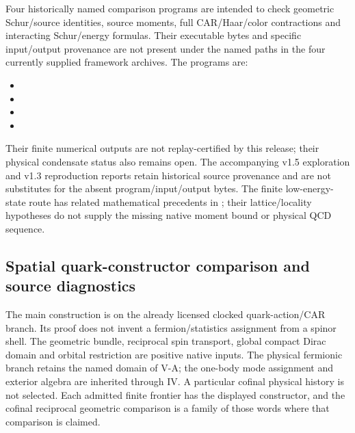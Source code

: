 \documentclass[12pt,a4paper]{article}
\begin{document}
Four historically named comparison programs are intended to check
geometric Schur/source identities, source moments, full CAR/Haar/color
contractions and interacting Schur/energy formulas. Their executable
bytes and specific input/output provenance are not present under the named
paths in the four currently supplied framework archives. The programs are:
\begin{itemize}
\item {}
\item {}
\item {}
\item {}
\end{itemize}
Their finite numerical outputs are not replay-certified by this release;
their physical condensate status also remains open. The accompanying v1.5
exploration and v1.3 reproduction reports retain historical source
provenance and are not substitutes for the absent program/input/output bytes.
The finite low-energy-state route has related mathematical precedents
in \cite{KomaTasaki1994SymmetryBreaking,Tasaki2018LongRangeOrder};
their lattice/locality hypotheses do not supply the missing native
moment bound or physical QCD sequence.





\subsection{Spatial quark-constructor comparison and source diagnostics}
\label{p10:app:v2189-native-spatial-quark-comparison}

The main construction is on the already licensed clocked quark-action/CAR
branch. Its proof does not invent a fermion/statistics assignment from a
spinor shell. The geometric bundle, reciprocal spin transport, global
compact Dirac domain and orbital restriction are positive native inputs.
The physical fermionic branch retains the named domain of V-A; the one-body
mode assignment and exterior algebra are inherited through IV. A particular
cofinal physical history is not selected. Each admitted finite frontier has
the displayed constructor, and the cofinal reciprocal geometric comparison
is a family of those words where that comparison is claimed.
\end{document}
